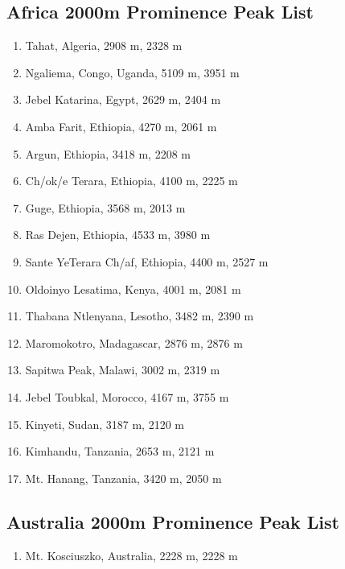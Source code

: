 \documentclass[10pt,twocolumn,letterpaper]{article}
\begin{document}
\subsection{Africa 2000m Prominence Peak List}
\begin{flushleft}
\begin{enumerate}
    \item Tahat, Algeria, 2908 m, 2328 m
    \item Ngaliema, Congo, Uganda, 5109 m, 3951 m
    \item Jebel Katarina, Egypt, 2629 m, 2404 m
    \item Amba Farit, Ethiopia, 4270 m, 2061 m
    \item Argun, Ethiopia, 3418 m, 2208 m
    \item Ch/ok/e Terara, Ethiopia, 4100 m, 2225 m
    \item Guge, Ethiopia, 3568 m, 2013 m
    \item Ras Dejen, Ethiopia, 4533 m, 3980 m
    \item Sante YeTerara Ch/af, Ethiopia, 4400 m, 2527 m
    \item Oldoinyo Lesatima, Kenya, 4001 m, 2081 m
    \item Thabana Ntlenyana, Lesotho, 3482 m, 2390 m
    \item Maromokotro, Madagascar, 2876 m, 2876 m
    \item Sapitwa Peak, Malawi, 3002 m, 2319 m
    \item Jebel Toubkal, Morocco, 4167 m, 3755 m
    \item Kinyeti, Sudan, 3187 m, 2120 m
    \item Kimhandu, Tanzania, 2653 m, 2121 m
    \item Mt. Hanang, Tanzania, 3420 m, 2050 m
\end{enumerate}
\end{flushleft}

\subsection{Australia 2000m Prominence Peak List}
\begin{flushleft}
\begin{enumerate}
    \item Mt. Kosciuszko, Australia, 2228 m, 2228 m
\end{enumerate}
\end{flushleft}
\end{document}
